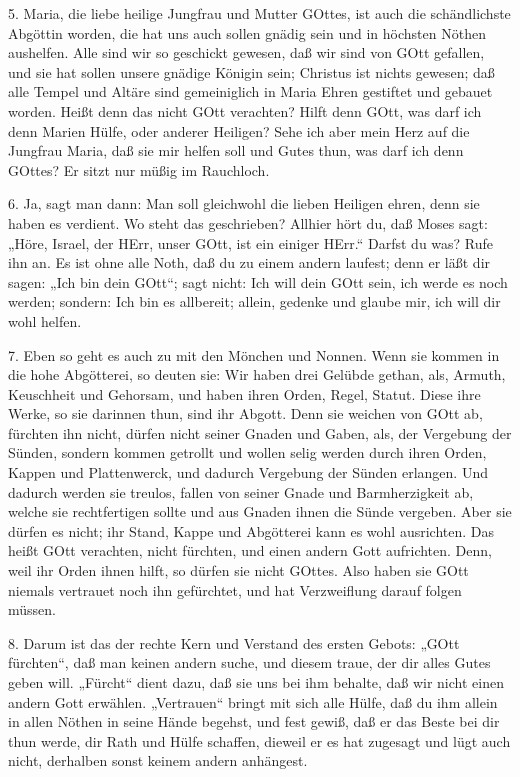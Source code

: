 5. Maria, die liebe heilige Jungfrau und Mutter GOttes, ist auch die schändlichste Abgöttin worden, die hat uns auch sollen gnädig sein und in höchsten Nöthen aushelfen. Alle sind wir so geschickt gewesen, daß wir sind von GOtt gefallen, und sie hat sollen unsere gnädige Königin sein; Christus ist nichts gewesen; daß alle Tempel und Altäre sind gemeiniglich in Maria Ehren gestiftet und gebauet worden. Heißt denn das nicht GOtt verachten? Hilft denn GOtt, was darf ich denn Marien Hülfe, oder anderer Heiligen? Sehe ich aber mein Herz auf die Jungfrau Maria, daß sie mir helfen soll und Gutes thun, was darf ich denn GOttes? Er sitzt nur müßig im Rauchloch.

6. Ja, sagt man dann: Man soll gleichwohl die lieben Heiligen ehren, denn sie haben es verdient. Wo steht das geschrieben? Allhier hört du, daß Moses sagt: „Höre, Israel, der HErr, unser GOtt, ist ein einiger HErr.“ Darfst du was? Rufe ihn an. Es ist ohne alle Noth, daß du zu einem andern laufest; denn er läßt dir sagen: „Ich bin dein GOtt“; sagt nicht: Ich will dein GOtt sein, ich werde es noch werden; sondern: Ich bin es allbereit; allein, gedenke und glaube mir, ich will dir wohl helfen.

7. Eben so geht es auch zu mit den Mönchen und Nonnen. Wenn sie kommen in die hohe Abgötterei, so deuten sie: Wir haben drei Gelübde gethan, als, Armuth, Keuschheit und Gehorsam, und haben ihren Orden, Regel, Statut. Diese ihre Werke, so sie darinnen thun, sind ihr Abgott. Denn sie weichen von GOtt ab, fürchten ihn nicht, dürfen nicht seiner Gnaden und Gaben, als, der Vergebung der Sünden, sondern kommen getrollt und wollen selig werden durch ihren Orden, Kappen und Plattenwerck, und dadurch Vergebung der Sünden erlangen. Und dadurch werden sie treulos, fallen von seiner Gnade und Barmherzigkeit ab, welche sie rechtfertigen sollte und aus Gnaden ihnen die Sünde vergeben. Aber sie dürfen es nicht; ihr Stand, Kappe und Abgötterei kann es wohl ausrichten. Das heißt GOtt verachten, nicht fürchten, und einen andern Gott aufrichten. Denn, weil ihr Orden ihnen hilft, so dürfen sie nicht GOttes. Also haben sie GOtt niemals vertrauet noch ihn gefürchtet, und hat Verzweiflung darauf folgen müssen.

8. Darum ist das der rechte Kern und Verstand des ersten Gebots: „GOtt fürchten“, daß man keinen andern suche, und diesem traue, der dir alles Gutes geben will. „Fürcht“ dient dazu, daß sie uns bei ihm behalte, daß wir nicht einen andern Gott erwählen. „Vertrauen“ bringt mit sich alle Hülfe, daß du ihm allein in allen Nöthen in seine Hände begehst, und fest gewiß, daß er das Beste bei dir thun werde, dir Rath und Hülfe schaffen, dieweil er es hat zugesagt und lügt auch nicht, derhalben sonst keinem andern anhängest.

